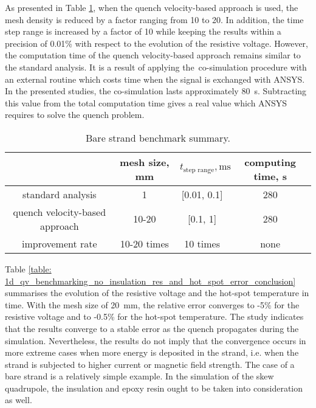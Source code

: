 As presented in Table \ref{table: 1d_qv_benchmarking_no_insulation_methods_comparison}, when the quench velocity-based approach is used, the mesh density is reduced by a factor ranging from 10 to 20. In addition, the time step range is increased by a factor of 10 while keeping the results within a precision of 0.01\% with respect to the evolution of the resistive voltage. However, the computation time of the quench velocity-based approach remains similar to the standard analysis. It is a result of applying the~co-simulation procedure with an external routine which costs time when the signal is exchanged with ANSYS. In the presented studies, the co-simulation lasts approximately 80~s. Subtracting this value from the total computation time gives a real value which ANSYS requires to solve the quench problem. 

\begin{table}[H]
    \caption{Bare strand benchmark summary.} 
    \vspace{-1.em} 
    \fontsize{10}{10}
    \selectfont 
    \renewcommand{\arraystretch}{1.5}
    \begin{center}
        \begin{tabular}{ cccc }  
        \hline
          & mesh size, mm & $t_\text{step range},\text{ms}$ & computing time, s\\
        \hline
        standard analysis & 1 & [0.01, 0.1] & 280 \\
        quench velocity-based approach & 10-20 & [0.1, 1] & 280 \\
        \hline 
        improvement rate & 10-20 times & 10 times & none\\
        \end{tabular}
    \end{center}  
     \label{table: 1d_qv_benchmarking_no_insulation_methods_comparison}
 \end{table}
 
Table \ref{table: 1d_qv_benchmarking_no_insulation_res_and_hot_spot_error_conclusion} summarises the evolution of the resistive voltage and the hot-spot temperature in time. With the mesh size of 20~mm, the relative error converges to -5\% for the resistive voltage and to -0.5\% for the hot-spot temperature. The study indicates that the results converge to a stable error as the quench propagates during the simulation. Nevertheless, the results do not imply that the convergence occurs in more extreme cases when more energy is deposited in the strand, i.e. when the strand is subjected to higher current or magnetic field strength. The case of a bare strand is a relatively simple example. In the simulation of the skew quadrupole, the insulation and epoxy resin ought to be taken into consideration as well. 
 
